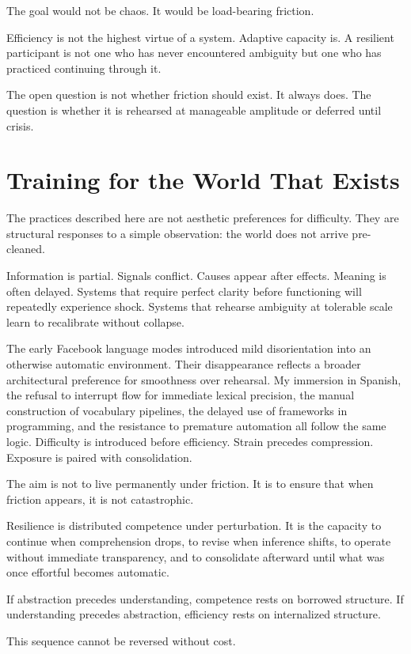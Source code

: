 \documentclass[12pt]{article}
\begin{document}
The goal would not be chaos. It would be load-bearing friction.

Efficiency is not the highest virtue of a system. Adaptive capacity is. A resilient participant is not one who has never encountered ambiguity but one who has practiced continuing through it.

The open question is not whether friction should exist. It always does. The question is whether it is rehearsed at manageable amplitude or deferred until crisis.

\section*{Training for the World That Exists}

The practices described here are not aesthetic preferences for difficulty. They are structural responses to a simple observation: the world does not arrive pre-cleaned.

Information is partial. Signals conflict. Causes appear after effects. Meaning is often delayed. Systems that require perfect clarity before functioning will repeatedly experience shock. Systems that rehearse ambiguity at tolerable scale learn to recalibrate without collapse.

The early Facebook language modes introduced mild disorientation into an otherwise automatic environment. Their disappearance reflects a broader architectural preference for smoothness over rehearsal. My immersion in Spanish, the refusal to interrupt flow for immediate lexical precision, the manual construction of vocabulary pipelines, the delayed use of frameworks in programming, and the resistance to premature automation all follow the same logic. Difficulty is introduced before efficiency. Strain precedes compression. Exposure is paired with consolidation.

The aim is not to live permanently under friction. It is to ensure that when friction appears, it is not catastrophic.

Resilience is distributed competence under perturbation. It is the capacity to continue when comprehension drops, to revise when inference shifts, to operate without immediate transparency, and to consolidate afterward until what was once effortful becomes automatic.

If abstraction precedes understanding, competence rests on borrowed structure. If understanding precedes abstraction, efficiency rests on internalized structure.

This sequence cannot be reversed without cost.
\end{document}

